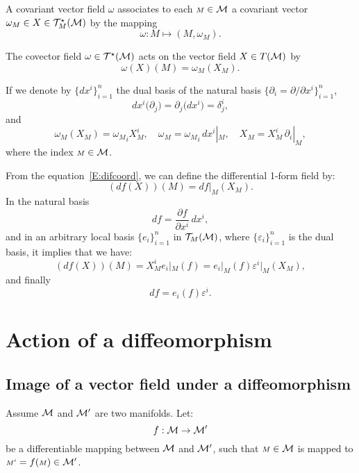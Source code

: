 A covariant vector field $\omega$ associates to each $ {\scriptstyle M}\in \mathcal{M}$ a covariant vector $\omega_{\scriptstyle M} \in X\in \mathcal{T}^{\star}_{\scriptstyle M}(\mathcal{M})$ by the mapping \[\omega: {\scriptstyle M}\mapsto ({\scriptstyle M},\omega_{\scriptstyle M}).\]

The covector field $\omega \in  \mathcal{T}^{\star}(\mathcal{M})$ acts on the vector field $X\in  T(\mathcal{M})$
by
\begin{equation}
\omega(X)({\scriptstyle M})=\omega_{\scriptstyle M}(X_{\scriptstyle M}).
\end{equation}


If we denote by $ \{dx^{i}\}_{i=1}^{n}$ the dual basis of the  natural basis $\{\partial_{i}=\partial/\partial x^{i}\}_{i=1}^{n}$,
\[dx^{i}\big(\partial_{j}\big) = \partial_{j}\big(dx^{i}\big)=\delta^{i}_{j},\]
and
\[
\omega_{\scriptstyle M}(X_{\scriptstyle M})={\omega_{\scriptstyle M}}_{i} X_{\scriptstyle M}^{i},\quad \omega_{\scriptstyle M}={\omega_{\scriptstyle M} }_{i}\,dx^{i}|_{\scriptstyle M},\quad  X_{\scriptstyle M} =X_{\scriptstyle M}^{i}\, \partial_{i}|_{\scriptstyle M}, \]
where the index ${\scriptstyle M}\in \mathcal{M}$. 
\, 

From the equation~\eqref{E:difcoord}, we can define the differential 1-form field by:
\begin{equation}
(df(X))({\scriptstyle M})=df|_{\scriptstyle M}(X_{\scriptstyle M}).
\end{equation}
In the natural basis 
\[df=\frac{\partial f}{\partial x^{i}}\,dx^{i},\]
and in an arbitrary local basis  $\{e_{i}\}_{i=1}^{n}$ in $\mathcal{T}_{\scriptstyle M}(\mathcal{M})$, where $\{\varepsilon_{i}\}_{i=1}^{n}$ is the dual basis, it implies that we have: 
\[(df(X))({\scriptstyle M})= X^{i}_{\scriptstyle M} e_{i}|_{\scriptstyle M} (f)= e_{i}|_{\scriptstyle M}(f)\varepsilon^{i}|_{\scriptstyle M}(X_{\scriptstyle M}),\]
and finally
\begin{equation} \label{E:diffieldcoord}
df= e_{i}(f)\varepsilon^{i}.
\end{equation}

\section{Action of a diffeomorphism}

\subsection{Image of a vector field under a diffeomorphism}
Assume $\mathcal{M}$ and $\mathcal{M}'$ are two manifolds. Let: \[f:\mathcal{M}\to \mathcal{M}'\] be a differentiable mapping between  $\mathcal{M}$ and $\mathcal{M}'$, such that ${\scriptstyle M}\in \mathcal{M}$ is mapped to ${\scriptstyle M'}=f({\scriptstyle M})\in \mathcal{M}'$. 

